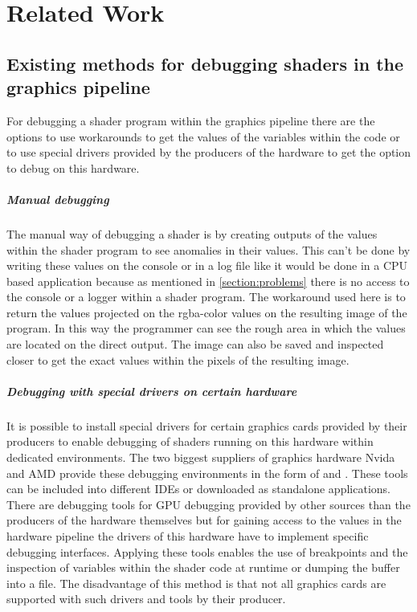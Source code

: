 
\chapter{Related Work}\label{cha:RelatedWork}
\section{Existing methods for debugging shaders in the graphics pipeline}
\label{section:debuggingMethods}

For debugging a shader program within the graphics pipeline there are the options to use workarounds to get the values of the variables within the code or to use special drivers provided by the producers of the hardware to get the option to debug on this hardware.

\paragraph{Manual debugging}

The manual way of debugging a shader is by creating outputs of the values within the shader program to see anomalies in their values. This can't be done by writing these values on the console or in a log file like it would be done in a CPU based application because as mentioned in \autoref{section:problems} there is no access to the console or a logger within a shader program. The workaround used here is to return the values projected on the rgba-color values on the resulting image of the program. In this way the programmer can see the rough area in which the values are located on the direct output. The image can also be saved and inspected closer to get the exact values within the pixels of the resulting image.

\paragraph{Debugging with special drivers on certain hardware}
\label{section:debuggingMethods_drivers}

It is possible to install special drivers for certain graphics cards provided by their producers to enable debugging of shaders running on this hardware within dedicated environments. The two biggest suppliers of graphics hardware Nvida and AMD provide these debugging environments in the form of \cite{Nvidia_Nsight} and \cite{AMD_GPUPerfStudio}. These tools can be included into different IDEs or downloaded as standalone applications. There are debugging tools for GPU debugging provided by other sources than the producers of the hardware themselves but for gaining access to the values in the hardware pipeline the drivers of this hardware have to implement specific debugging interfaces. Applying these tools enables the use of breakpoints and the inspection of variables within the shader code at runtime or dumping the buffer into a file. The disadvantage of this method is that not all graphics cards are supported with such drivers and tools by their producer.

